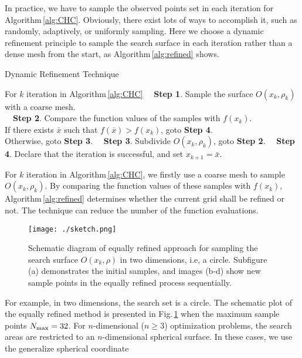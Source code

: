 \documentclass[mathpazo]{aamm}
\newcommand{\bmx}{x}
\begin{document}
In practice, we have to sample the observed
points set in each iteration for Algorithm\,\ref{alg:CHC}.
Obviously, there exist lots of ways to accomplish it, such as
randomly, adaptively, or uniformly sampling. Here we
choose a dynamic refinement principle to sample the search surface 
in each iteration rather than a dense mesh from the start, as
Algorithm\,\ref{alg:refined} shows.
\begin{algorithm}[]
	\caption{Dynamic Refinement Technique} 
	\label{alg:refined}
\begin{algorithmic}[]
	\STATE For $k$ iteration in Algorithm\,\ref{alg:CHC}
	\STATE ~~\textbf{Step 1}. Sample the surface
	$O(\bmx_k, \rho_k)$ with a coarse mesh. \\
	\STATE ~~\textbf{Step 2}. Compare the function values of the
	samples with $f(\bmx_k)$.
	\\
	\hspace{1.5cm} If there exists $\bar\bmx$ such that
	$f(\bar\bmx)>f(\bmx_k)$, goto \textbf{Step 4}.
	\\
	\hspace{1.5cm} Otherwise, goto \textbf{Step 3}.
	\STATE ~~\textbf{Step 3}. Subdivide $O(\bmx_k, \rho_k)$, goto
	\textbf{Step 2}.
	\STATE ~~\textbf{Step 4}. Declare that the iteration is
	successful, and set $\bmx_{k+1}= \bar\bmx$.
\end{algorithmic}
\end{algorithm}
For $k$ iteration in Algorithm\,\ref{alg:CHC}, we firstly use
a coarse mesh to sample $O(\bmx_k, \rho_k)$. By comparing the
function values of these samples with $f(\bmx_k)$,
Algorithm\,\ref{alg:refined} determines whether the current grid
shall be refined or not. The technique can reduce the number of
the function evaluations.
\begin{figure}[!htbp]
	\centering
	  \texttt{[image: ./sketch.png]}
	\caption{Schematic diagram of equally refined approach for
	sampling the search surface $O(\bmx_k, \rho)$ in two
	dimensions, i.e, a circle. Subfigure (a) demonstrates the initial samples,
	and images (b-d) show new sample points in the equally
	refined process sequentially.}
\label{fig:obset:sketch}
\end{figure}
For example, in two dimensions, the search set is a circle.
The schematic plot of the equally
refined method is presented in Fig.\,\ref{fig:obset:sketch} when
the maximum sample points $N_{\rm{max}}=32$.
For $n$-dimensional ($n\geq 3$) optimization problems, the search
areas are restricted to an $n$-dimensional spherical surface.
In these cases, we use the generalize spherical coordinate
\end{document}
